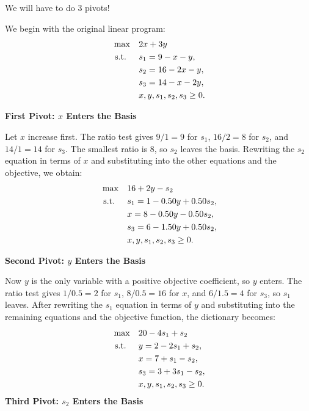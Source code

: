 \begin{solution}
We will have to do 3 pivots!

We begin with the original linear program:
\[
\begin{aligned}
\max\quad & 2x + 3y \\
\text{ s.t. }\quad & s_1 = 9 - x - y, \\
                        & s_2 = 16 - 2x - y, \\
                        & s_3 = 14 - x - 2y, \\
                        & x, y, s_1, s_2, s_3 \ge 0.
\end{aligned}
\]

\textbf{First Pivot: \(x\) Enters the Basis}

Let \(x\) increase first. The ratio test gives \(9/1 = 9\) for \(s_1\), \(16/2 = 8\) for \(s_2\), and \(14/1 = 14\) for \(s_3\). The smallest ratio is \(8\), so \(s_2\) leaves the basis. Rewriting the \(s_2\) equation in terms of \(x\) and substituting into the other equations and the objective, we obtain:
\[
\begin{aligned}
\max\quad & 16 + 2y - s_2 \\
\text{ s.t. }\quad & s_1 = 1 - 0.50y + 0.50s_2, \\
                        & x = 8 - 0.50y - 0.50s_2, \\
                        & s_3 = 6 - 1.50y + 0.50s_2, \\
                        & x, y, s_1, s_2, s_3 \ge 0.
\end{aligned}
\]

\textbf{Second Pivot: \(y\) Enters the Basis}

Now \(y\) is the only variable with a positive objective coefficient, so \(y\) enters. The ratio test gives \(1/0.5 = 2\) for \(s_1\), \(8/0.5 = 16\) for \(x\), and \(6/1.5 = 4\) for \(s_3\), so \(s_1\) leaves. After rewriting the \(s_1\) equation in terms of \(y\) and substituting into the remaining equations and the objective function, the dictionary becomes:
\[
\begin{aligned}
\max\quad & 20 - 4s_1 + s_2 \\
\text{ s.t. }\quad & y = 2 - 2s_1 + s_2, \\
                        & x = 7 + s_1 - s_2, \\
                        & s_3 = 3 + 3s_1 - s_2, \\
                        & x, y, s_1, s_2, s_3 \ge 0.
\end{aligned}
\]
\textbf{Third Pivot: \(s_2\) Enters the Basis}


\end{solution}
